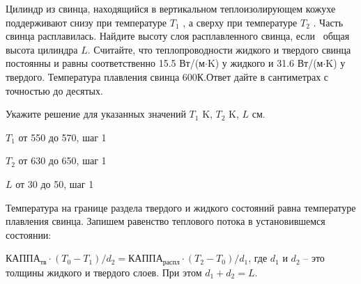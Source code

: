 
Цилиндр из свинца, находящийся в вертикальном теплоизолирующем кожухе поддерживают снизу при температуре  
$T_1$ , а сверху при температуре  $T_2$ . Часть свинца расплавилась. Найдите высоту слоя расплавленного свинца, 
если  общая высота цилиндра $L$. Считайте, что теплопроводности жидкого и твердого свинца постоянны и 
равны соответственно 15.5 Вт/(м$\cdot$K) у жидкого и 31.6 Вт/(м$\cdot$K) у твердого. 
Температура плавления свинца 600К.Ответ дайте в сантиметрах с точностью до десятых.

Укажите решение для указанных значений $T_1$ K, $T_2$ K, $L$ см.

\paramSection

$T_1$ от 550 до 570, шаг 1

$T_2$ от 630 до 650, шаг 1

$L$ от 30 до 50, шаг 1

\soultionSection

Температура на границе раздела твердого и жидкого состояний равна температуре плавления свинца. 
Запишем равенство теплового потока в установившемся состоянии:

$\text{КАППА}_{\text{тв}} \cdot (T_0-T_1)/d_2 = \text{КАППА}_{\text{распл}} \cdot (T_2-T_0)/d_1$, 
где $d_1$ и $d_2$ – это толщины жидкого и твердого слоев. При этом $d_1+d_2 = L$.

